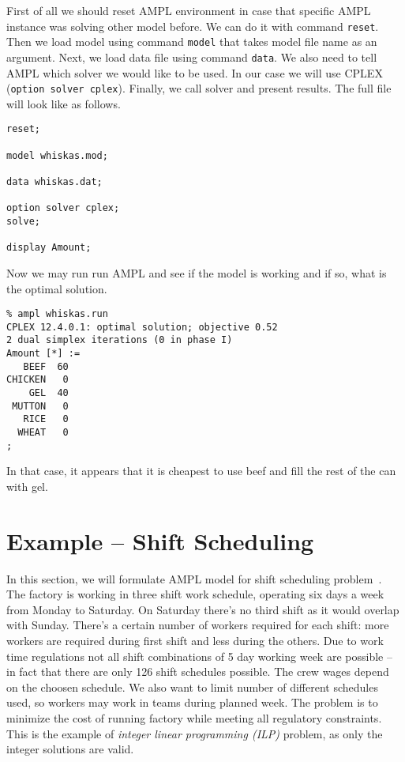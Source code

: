 First of all we should reset AMPL environment in case that specific AMPL instance was solving other model before. We can do it with command \texttt{reset}. Then we load model using command \texttt{model} that takes model file name as an argument. Next, we load data file using command \texttt{data}. We also need to tell AMPL which solver we would like to be used. In our case we will use CPLEX (\texttt{option solver cplex}). Finally, we call solver and present results. The full file will look like as follows.

\begin{lstlisting}
reset;

model whiskas.mod;

data whiskas.dat;

option solver cplex;
solve;

display Amount;
\end{lstlisting}

Now we may run run AMPL and see if the model is working and if so, what is the optimal solution.

\begin{lstlisting}
% ampl whiskas.run
CPLEX 12.4.0.1: optimal solution; objective 0.52
2 dual simplex iterations (0 in phase I)
Amount [*] :=
   BEEF  60
CHICKEN   0
    GEL  40
 MUTTON   0
   RICE   0
  WHEAT   0
;
\end{lstlisting}

In that case, it appears that it is cheapest to use beef and fill the rest of the can with gel.

\section{Example -- Shift Scheduling}
\label{sec:ampl:sched}

In this section, we will formulate AMPL model for shift scheduling problem~\cite{Fourer2002}. The factory is working in three shift work schedule, operating six days a week from Monday to Saturday. On Saturday there's no third shift as it would overlap with Sunday. There's a certain number of workers required for each shift: more workers are required during first shift and less during the others. Due to work time regulations not all shift combinations of 5 day working week are possible -- in fact that there are only 126 shift schedules possible. The crew wages depend on the choosen schedule. We also want to limit number of different schedules used, so workers may work in teams during planned week. The problem is to minimize the cost of running factory while meeting all regulatory constraints. This is the example of \emph{integer linear programming (ILP)} problem, as only the integer solutions are valid. 
 
